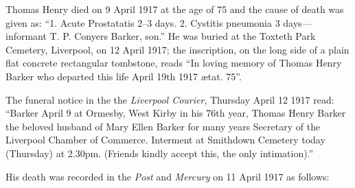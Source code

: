 Thomas Henry died on 9 April 1917 at the age of 75\cite{THBdeathcert} and the cause of death was given as: ``1. Acute Prostatatis 2--3 days. 2. Cystitis pneumonia 3 days---informant T. P. Conyers Barker, son.''  He was buried at the Toxteth Park Cemetery, Liverpool, on 12 April 1917;\cite{ToxtethBarker20} the inscription, on the long side of a plain flat concrete rectangular tombstone, reads ``In loving memory of Thomas Henry Barker who departed this life April 19th 1917 \ae{}tat. 75''.\cite{THBgraveInscription}

The funeral notice in the the \emph{Liverpool Courier}, Thursday April 12 1917 read:
``Barker April 9 at Ormesby, West Kirby in his 76th year, Thomas Henry Barker the beloved husband of Mary Ellen Barker for many years Secretary of the Liverpool Chamber of Commerce. Interment at Smithdown Cemetery today (Thursday) at 2.30pm. (Friends kindly accept this, the only intimation).''

His death was recorded in the \emph{Post} and \emph{Mercury} on 11 April 1917 as follows:\cite{LiverpoolPost1917}

